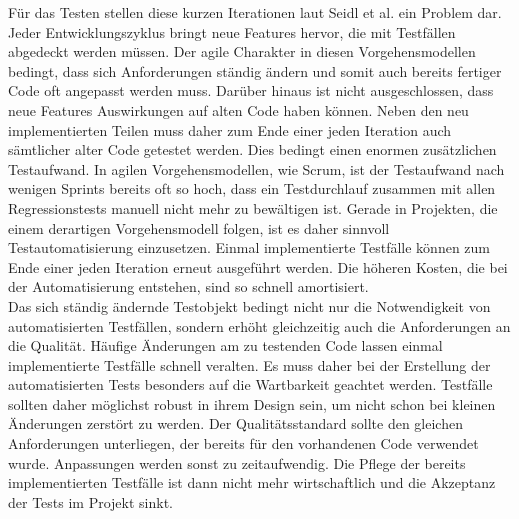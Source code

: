 Für das Testen stellen diese kurzen Iterationen laut  Seidl et al. \cite[vgl. S.24]{seidl_basiswissen_2012} ein Problem dar.
Jeder Entwicklungszyklus bringt neue Features hervor, die mit Testfällen abgedeckt werden müssen. Der agile Charakter in diesen Vorgehensmodellen bedingt, dass sich Anforderungen ständig ändern und somit auch bereits fertiger Code oft angepasst werden muss. Darüber hinaus ist nicht ausgeschlossen, dass neue Features Auswirkungen auf alten Code haben können. Neben den neu implementierten Teilen muss daher zum Ende einer jeden Iteration auch sämtlicher alter Code getestet werden.
Dies bedingt einen enormen zusätzlichen Testaufwand. 
In agilen Vorgehensmodellen, wie Scrum, ist der Testaufwand nach wenigen Sprints bereits oft so hoch, dass ein Testdurchlauf zusammen mit allen Regressionstests manuell nicht mehr zu bewältigen ist.
Gerade in Projekten, die einem derartigen Vorgehensmodell folgen, ist es daher sinnvoll Testautomatisierung einzusetzen. Einmal implementierte Testfälle können zum Ende einer jeden Iteration erneut ausgeführt werden. Die höheren Kosten, die bei der Automatisierung entstehen, sind so schnell amortisiert.\\
Das sich ständig ändernde Testobjekt bedingt nicht nur die Notwendigkeit von automatisierten Testfällen, sondern erhöht gleichzeitig auch die Anforderungen an die Qualität. Häufige Änderungen am zu testenden Code lassen einmal implementierte Testfälle schnell veralten. Es muss daher bei der Erstellung der automatisierten Tests besonders auf die Wartbarkeit geachtet werden.
Testfälle sollten daher möglichst robust in ihrem Design sein, um nicht schon bei kleinen Änderungen zerstört zu werden. Der Qualitätsstandard sollte den gleichen Anforderungen unterliegen, der bereits für den vorhandenen Code verwendet wurde. Anpassungen werden sonst zu zeitaufwendig. Die Pflege der bereits implementierten Testfälle ist dann nicht mehr wirtschaftlich und die Akzeptanz der Tests im Projekt sinkt.
